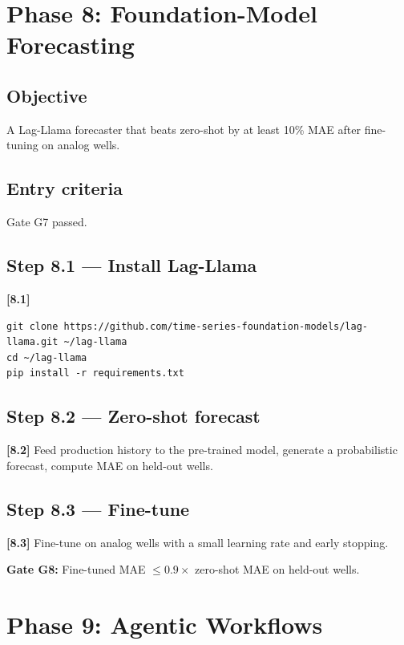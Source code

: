 \documentclass[10pt,a4paper]{article}
\newcommand{\stepID}[1]{\textsf{\textbf{[#1]}}}
\begin{document}
\section{Phase 8: Foundation-Model Forecasting}
\label{sec:phase8}

\subsection{Objective}
A Lag-Llama forecaster that beats zero-shot by at least 10\% MAE after fine-tuning on analog wells.

\subsection{Entry criteria}
Gate G7 passed.

\subsection{Step 8.1 --- Install Lag-Llama}

\stepID{8.1}
\begin{lstlisting}[style=sh]
git clone https://github.com/time-series-foundation-models/lag-llama.git ~/lag-llama
cd ~/lag-llama
pip install -r requirements.txt
\end{lstlisting}

\subsection{Step 8.2 --- Zero-shot forecast}

\stepID{8.2} Feed production history to the pre-trained model, generate a probabilistic forecast, compute MAE on held-out wells.

\subsection{Step 8.3 --- Fine-tune}

\stepID{8.3} Fine-tune on analog wells with a small learning rate and early stopping.

\begin{gate}
\textbf{Gate G8:} Fine-tuned MAE $\leq 0.9 \times$ zero-shot MAE on held-out wells.
\end{gate}

\section{Phase 9: Agentic Workflows}
\label{sec:phase9}
\end{document}
